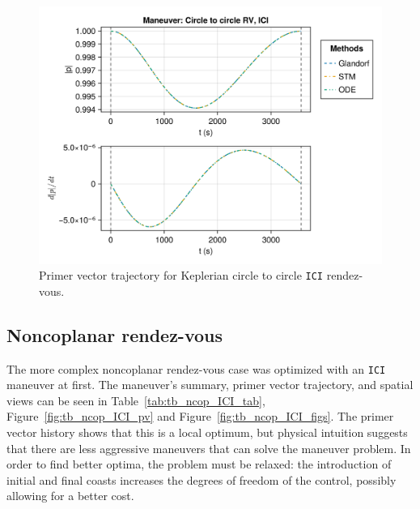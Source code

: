 \begin{figure}[htbp]
    \centering
    \includegraphics[width=0.7\linewidth]{../results/two_body/hohmann/ICI_primer_vector.png}
    \caption{Primer vector trajectory for Keplerian circle to circle \texttt{ICI} rendez-vous.}
    \label{fig:tb_c2c_ICI_pv}
\end{figure}

\subsection{Noncoplanar rendez-vous}

The more complex noncoplanar rendez-vous case was optimized with an \texttt{ICI} maneuver at first. The maneuver's summary, primer vector trajectory, and spatial views can be seen in Table~\ref{tab:tb_ncop_ICI_tab}, Figure~\ref{fig:tb_ncop_ICI_pv} and Figure~\ref{fig:tb_ncop_ICI_figs}. The primer vector history shows that this is a local optimum, but physical intuition suggests that there are less aggressive maneuvers that can solve the maneuver problem. In order to find better optima, the problem must be relaxed: the introduction of initial and final coasts increases the degrees of freedom of the control, possibly allowing for a better cost.

